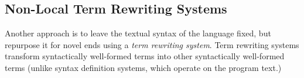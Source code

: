 {%



\subsection{Non-Local Term Rewriting Systems}\label{sec:non-local-term-rewriting}
Another approach is to leave the textual syntax of the language fixed, but repurpose it for novel ends using a \emph{term rewriting system}. Term rewriting systems transform syntactically well-formed terms into other syntactically well-formed terms (unlike syntax definition systems, which operate on the program text.) 

}
